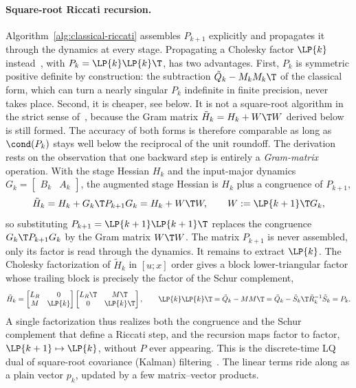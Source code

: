 \paragraph{Square-root Riccati recursion.}
Algorithm~\ref{alg:classical-riccati} assembles $P_{k+1}$ explicitly and propagates
it through the dynamics at every stage. Propagating a Cholesky factor $\LP{k}$
instead~\cite{frison2013efficient}, with $P_k = \LP{k}\LP{k}\T$, has two advantages.
First, $P_k$ is symmetric positive definite by construction: the subtraction
$\tilde{Q}_k - M_k M_k\T$ of the classical form, which can turn a nearly singular
$P_k$ indefinite in finite precision, never takes place. Second, it is cheaper, see
below. It is not a square-root algorithm in the strict sense
of~\cite{kaminski1971discrete}, because the Gram matrix
$\tilde{H}_k = H_k + W\T W$ derived below is still formed. The accuracy of both forms is
therefore comparable as long as $\cond(P_k)$ stays well below the reciprocal of
the unit roundoff.
The derivation rests on the observation that one backward step is entirely a
\emph{Gram-matrix} operation. With the stage Hessian $H_k$ and the input-major
dynamics $G_k = \begin{bmatrix} B_k & A_k \end{bmatrix}$, the augmented stage
Hessian is $H_k$ plus a congruence of $P_{k+1}$,
\[
\tilde{H}_k = H_k + G_k\T P_{k+1} G_k = H_k + W\T W ,
\qquad W := \LP{k+1}\T G_k ,
\]
so substituting $P_{k+1} = \LP{k+1}\LP{k+1}\T$ replaces the congruence
$G_k\T P_{k+1} G_k$ by the Gram matrix $W\T W$. The matrix $P_{k+1}$ is never assembled,
only its factor is read through the dynamics. It remains to extract $\LP{k}$.
The Cholesky factorization of $\tilde{H}_k$ in $[u;x]$ order gives a
block lower-triangular factor whose trailing block is precisely the factor of the
Schur complement,
\[
\tilde{H}_k =
\begin{bmatrix} L_R & 0 \\ M & \LP{k} \end{bmatrix}
\begin{bmatrix} L_R\T & M\T \\ 0 & \LP{k}\T \end{bmatrix} ,
\qquad
\LP{k} \LP{k}\T = \tilde Q_k - M M\T
                     = \tilde Q_k - \tilde S_k\T \tilde R_k^{-1} \tilde S_k = P_k .
\]
A single factorization thus realizes both the congruence and the Schur complement
that define a Riccati step, and the recursion maps factor to factor,
$\LP{k+1} \mapsto \LP{k}$, without $P$ ever appearing. This is the discrete-time
LQ dual of square-root covariance (Kalman) filtering~\cite{kalman1960new,kaminski1971discrete}. The linear terms ride along as
a plain vector $p_k$, updated by a few matrix--vector products.

